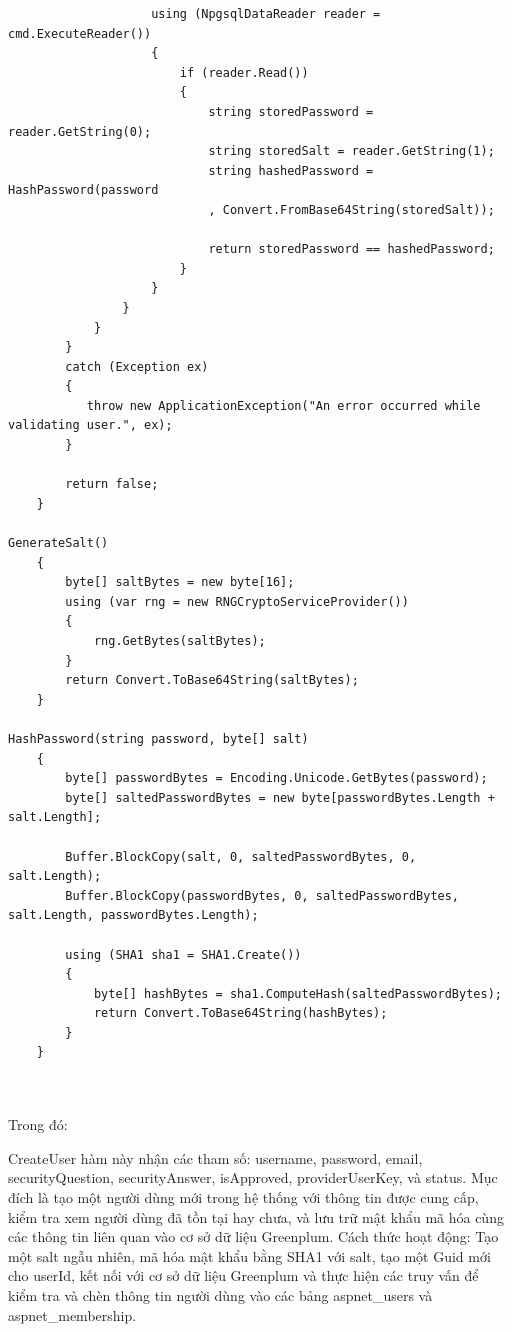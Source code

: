 \documentclass[14pt]{article}
\begin{document}
\begin{verbatim}
                    using (NpgsqlDataReader reader = cmd.ExecuteReader())
                    {
                        if (reader.Read())
                        {
                            string storedPassword = reader.GetString(0);
                            string storedSalt = reader.GetString(1);
                            string hashedPassword = HashPassword(password
                            , Convert.FromBase64String(storedSalt));

                            return storedPassword == hashedPassword;
                        }
                    }
                }
            }
        }
        catch (Exception ex)
        {
           throw new ApplicationException("An error occurred while validating user.", ex);
        }

        return false;
    }

GenerateSalt()
    {
        byte[] saltBytes = new byte[16];
        using (var rng = new RNGCryptoServiceProvider())
        {
            rng.GetBytes(saltBytes);
        }
        return Convert.ToBase64String(saltBytes);
    }

HashPassword(string password, byte[] salt)
    {
        byte[] passwordBytes = Encoding.Unicode.GetBytes(password);
        byte[] saltedPasswordBytes = new byte[passwordBytes.Length + salt.Length];

        Buffer.BlockCopy(salt, 0, saltedPasswordBytes, 0, salt.Length);
        Buffer.BlockCopy(passwordBytes, 0, saltedPasswordBytes, salt.Length, passwordBytes.Length);

        using (SHA1 sha1 = SHA1.Create())
        {
            byte[] hashBytes = sha1.ComputeHash(saltedPasswordBytes);
            return Convert.ToBase64String(hashBytes);
        }
    }



\end{verbatim}

Trong đó:

CreateUser hàm này nhận các tham số: username, password, email, securityQuestion, securityAnswer, isApproved, providerUserKey, và status. Mục đích là tạo một người dùng mới trong hệ thống với thông tin được cung cấp, kiểm tra xem người dùng đã tồn tại hay chưa, và lưu trữ mật khẩu mã hóa cùng các thông tin liên quan vào cơ sở dữ liệu Greenplum. Cách thức hoạt động: Tạo một salt ngẫu nhiên, mã hóa mật khẩu bằng SHA1 với salt, tạo một Guid mới cho userId, kết nối với cơ sở dữ liệu Greenplum và thực hiện các truy vấn để kiểm tra và chèn thông tin người dùng vào các bảng aspnet\_users và aspnet\_membership.
\end{document}
